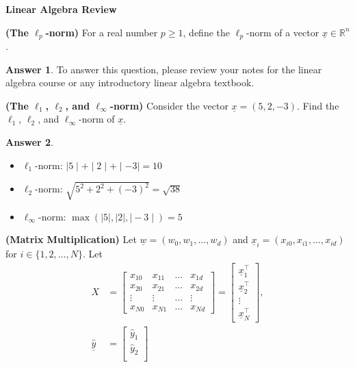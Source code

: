 \documentclass{article}
\renewcommand{\vec}[1]{\underline{#1}}
\newcommand{\vecw}{\vec{w}}
\newcommand{\vecx}{\vec{x}}
\theoremstyle{definition}
\newtheorem*{answer}{Answer}
\begin{document}
\begin{question}[start=0]
	\item \textbf{Linear Algebra Review}
	\begin{question}
		\item \textbf{(The \( \ell_p \)-norm)} For a real number \( p \geq 1 \), define the \( \ell_p \)-norm of a vector \( \vec{x} \in \mathbb{R}^n \).
		\begin{answer}
			To answer this question, please review your notes for the linear algebra course or any introductory linear algebra textbook.
		\end{answer}
		\item \textbf{(The \( \ell_1 \), \( \ell_2 \), and \( \ell_\infty \)-norm)} Consider the vector $\vecx = (5,2,-3)$. Find the \( \ell_1 \), \( \ell_2 \), and \( \ell_\infty \)-norm of $\vecx$.
		\begin{answer}
			~
			\begin{itemize}
				\item $\ell_1$-norm: $\mid5\mid + \mid2\mid + \mid-3\mid = 10$
				\item $\ell_2$-norm: $\sqrt{5^2 + 2^2 + (-3)^2} = \sqrt{38}$
				\item $\ell_\infty$-norm: $\max(\mid5\mid, \mid2\mid, \mid-3\mid) = 5$
			\end{itemize}
		\end{answer}
		\item \textbf{(Matrix Multiplication)} Let $\vecw=(w_0, w_1, \ldots, w_d)$ and $\vec{x}_i=(x_{i0}, x_{i1}, \ldots, x_{id})$ for $i \in \{1, 2, \ldots, N\}$. Let   
		\begin{align*}
			X &= \begin{bmatrix}
				x_{10} & x_{11} & \dots & x_{1d} \\
				x_{20} & x_{21} & \dots & x_{2d} \\
				\vdots & \vdots & \dots & \vdots \\
				x_{N0} & x_{N1} & \dots & x_{Nd}
			\end{bmatrix}=\begin{bmatrix}
				\vecx_{1}^\top \\
				\vecx_{2}^\top \\
				\vdots \\
				\vecx_{N}^\top
			\end{bmatrix},\\
			\vec{\hat{y}} &= \begin{bmatrix}
				\hat{y}_1 \\
				\hat{y}_2 \\

\end{bmatrix}
\end{align*}
\end{question}
\end{question}
\end{document}
